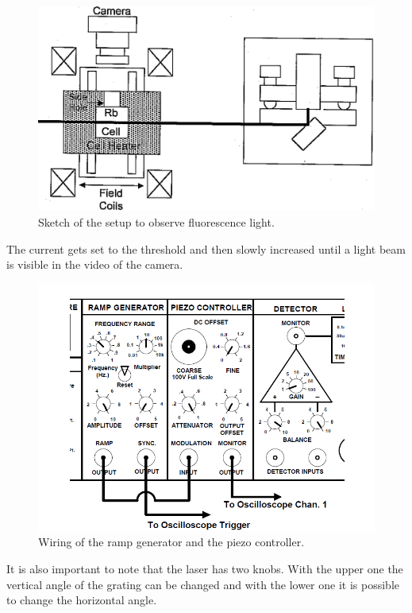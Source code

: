 \begin{figure}[H]
	\centering
	\includegraphics[width=\textwidth]{setup_fluorescence.png}
	\caption{Sketch of the setup to observe fluorescence light. \cite{V60}}
	\label{fig:fl}
\end{figure}

\noindent
The current gets set to the threshold and then slowly increased until a light beam is visible in the video of the 
camera.

\begin{figure}[H]
	\centering
	\includegraphics[width=\textwidth]{setup.png}
	\caption{Wiring of the ramp generator and the piezo controller. \cite{V60}}
	\label{fig:rg}
\end{figure}

\noindent
It is also important to note that the laser has two knobs. With the upper one the vertical angle of the grating can
be changed and with the lower one it is possible to change the horizontal angle.

